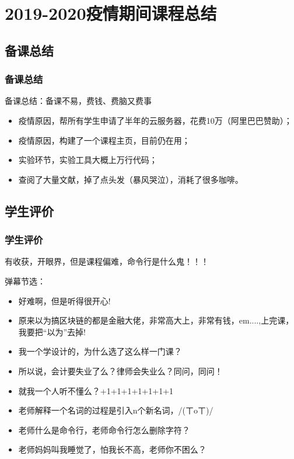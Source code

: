 \documentclass[11pt]{beamer}
\begin{document}
\begin{frame}
\begin{figure}
{\begin{minipage}[ht]{0.35\linewidth}
				\label{fig:teacher}
			\end{minipage}%
	}%
\end{figure}

\end{frame}


\section{2019-2020疫情期间课程总结}
	\subsection{备课总结}
	\begin{frame}
	\frametitle{备课总结}
	备课总结：备课不易，费钱、费脑又费事~
	\begin{itemize}
				\item 疫情原因，帮所有学生申请了半年的云服务器，花费10万（阿里巴巴赞助）；
				\item 疫情原因，构建了一个课程主页，目前仍在用；
				\item 实验环节，实验工具大概上万行代码；
				\item 查阅了大量文献，掉了点头发（暴风哭泣），消耗了很多咖啡。
			\end{itemize}	
	\end{frame}
	\subsection{学生评价}
	\begin{frame}
		\frametitle{学生评价} 
		有收获，开眼界，但是课程偏难，命令行是什么鬼！！！
		
		弹幕节选：
		\begin{itemize}
			\item 好难啊，但是听得很开心!
			\item 原来以为搞区块链的都是金融大佬，非常高大上，非常有钱，em....,上完课，我要把“以为”去掉!
			\item 我一个学设计的，为什么选了这么样一门课？
			\item 所以说，会计要失业了么？律师会失业么？同问，同问！
			\item 就我一个人听不懂么？+1+1+1+1+1+1+1
			\item 老师解释一个名词的过程是引入n个新名词，/(ㄒoㄒ)/~~
			\item 老师什么是命令行，老师命令行怎么删除字符？
			\item 老师妈妈叫我睡觉了，怕我长不高，老师你不困么？
		\end{itemize}
	\end{frame}
	
\end{document}
